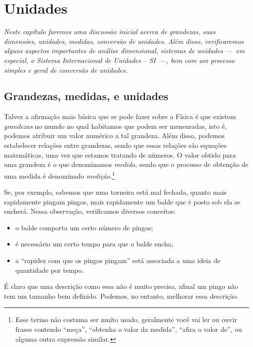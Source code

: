 \chapter{Unidades}
\label{Chap:Unidades}

\begin{fullwidth}
\it
    Neste capítulo faremos uma discussão inicial acerca de grandezas, suas dimensões, unidades, medidas, conversão de unidades. Além disso, verificaremos alguns aspectos importantes de análise dimensional, sistemas de unidades ---~em especial, o \emph{Sistema Internacional de Unidades -- SI}~---, bem com um processo simples e geral de conversão de unidades.
\end{fullwidth}

\section{Grandezas, medidas, e unidades}

Talvez a afirmação mais básica que se pode fazer sobre a Física é que existem \emph{grandezas} no mundo no qual habitamos que podem ser mensuradas, isto é, podemos atribuir um valor numérico a tal grandeza. Além disso, podemos estabelecer relações entre grandezas, sendo que essas relações são equações matemáticas, uma vez que estamos tratando de números. O valor obtido para uma grandeza é o que denominamos \emph{medida}, sendo que o processo de obtenção de uma medida é denominado \emph{medição}.\footnote{Esse termo não costuma ser muito usado, geralmente você vai ler ou ouvir frases contendo ``meça'', ``obtenha o valor da medida'', ``afira o valor de'', ou alguma outra expressão similar.}

Se, por exemplo, sabemos que uma torneira está mal fechada, quanto mais rapidamente pingam pingos, mais rapidamente um balde que é posto sob ela se encherá. Nessa observação, verificamos diversos conceitos:
\begin{itemize}
    \item o balde comporta um certo número de pingos;
    \item é necessário um certo tempo para que o balde encha;
    \item a ``rapidez com que os pingos pingam'' está associada a uma ideia de quantidade por tempo.
\end{itemize}
É claro que uma descrição como essa não é muito precisa, afinal um pingo não tem um tamanho bem definido. Podemos, no entanto, melhorar essa descrição.

